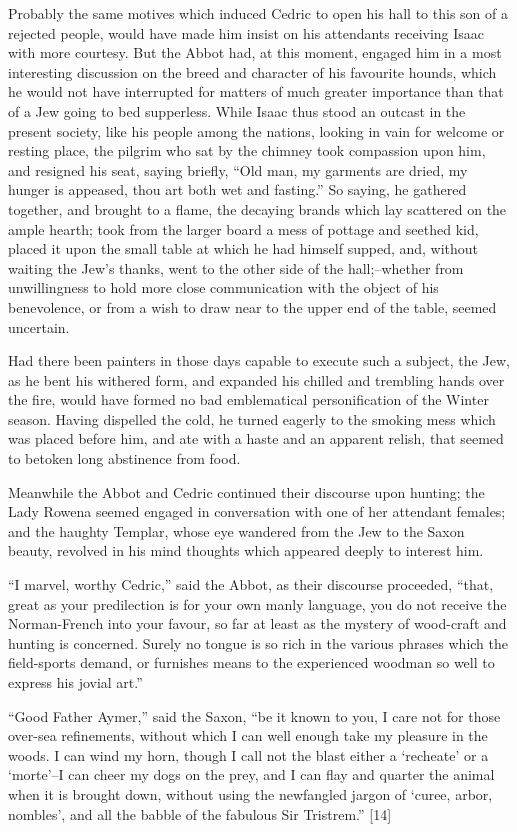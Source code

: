 Probably the same motives which induced Cedric to open his hall to this
son of a rejected people, would have made him insist on his attendants
receiving Isaac with more courtesy. But the Abbot had, at this moment,
engaged him in a most interesting discussion on the breed and character
of his favourite hounds, which he would not have interrupted for matters
of much greater importance than that of a Jew going to bed supperless.
While Isaac thus stood an outcast in the present society, like his
people among the nations, looking in vain for welcome or resting place,
the pilgrim who sat by the chimney took compassion upon him, and
resigned his seat, saying briefly, ``Old man, my garments are dried, my
hunger is appeased, thou art both wet and fasting.'' So saying, he
gathered together, and brought to a flame, the decaying brands which lay
scattered on the ample hearth; took from the larger board a mess of
pottage and seethed kid, placed it upon the small table at which he had
himself supped, and, without waiting the Jew's thanks, went to the other
side of the hall;--whether from unwillingness to hold more close
communication with the object of his benevolence, or from a wish to draw
near to the upper end of the table, seemed uncertain.

Had there been painters in those days capable to execute such a subject,
the Jew, as he bent his withered form, and expanded his chilled and
trembling hands over the fire, would have formed no bad emblematical
personification of the Winter season. Having dispelled the cold, he
turned eagerly to the smoking mess which was placed before him, and ate
with a haste and an apparent relish, that seemed to betoken long
abstinence from food.

Meanwhile the Abbot and Cedric continued their discourse upon hunting;
the Lady Rowena seemed engaged in conversation with one of her attendant
females; and the haughty Templar, whose eye wandered from the Jew to the
Saxon beauty, revolved in his mind thoughts which appeared deeply to
interest him.

``I marvel, worthy Cedric,'' said the Abbot, as their discourse
proceeded, ``that, great as your predilection is for your own manly
language, you do not receive the Norman-French into your favour, so far
at least as the mystery of wood-craft and hunting is concerned. Surely
no tongue is so rich in the various phrases which the field-sports
demand, or furnishes means to the experienced woodman so well to express
his jovial art.''

``Good Father Aymer,'' said the Saxon, ``be it known to you, I care not
for those over-sea refinements, without which I can well enough take my
pleasure in the woods. I can wind my horn, though I call not the blast
either a `recheate' or a `morte'--I can cheer my dogs on the prey, and I
can flay and quarter the animal when it is brought down, without using
the newfangled jargon of `curee, arbor, nombles', and all the babble of
the fabulous Sir Tristrem.'' {[}14{]}

